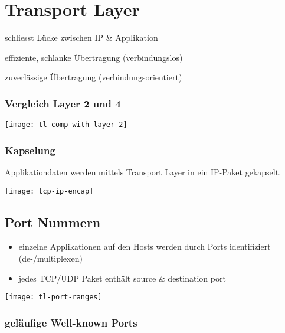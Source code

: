 \section{Transport Layer}

\begin{description}
    \item schliesst Lücke zwischen IP \& Applikation
    \item[UDP] effiziente, schlanke Übertragung (verbindungslos)
    \item[TCP] zuverlässige Übertragung (verbindungsorientiert)
\end{description}

\subsubsection{Vergleich Layer 2 und 4}
\begin{center}
    \texttt{[image: tl-comp-with-layer-2]}
\end{center}

\subsubsection{Kapselung}

Applikationdaten werden mittels Transport Layer in ein IP-Paket gekapselt.

\texttt{[image: tcp-ip-encap]}



\subsection{Port Nummern}

\begin{itemize}
    \item einzelne Applikationen auf den Hosts werden durch Ports identifiziert
          (de-/multiplexen)
    \item jedes TCP/UDP Paket enthält source \& destination port
\end{itemize}

\begin{center}
    \texttt{[image: tl-port-ranges]}
\end{center}

\subsubsection{geläufige Well-known Ports}

